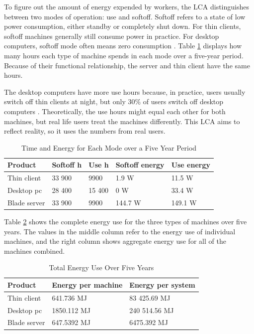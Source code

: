 \documentclass[final,journal,10pt,letterpaper,oneside,twocolumn,compsoc]%
{IEEEtran}
\begin{document}
To figure out the amount of energy expended by workers, the LCA distinguishes
between two modes of operation: use and softoff. Softoff refers to a state of
low power consumption, either standby or completely shut down. For thin clients,
softoff machines generally still consume power in practice. For desktop
computers, softoff mode often means zero consumption \cite{client}. Table
\ref{tab:6}
displays how many hours each type of machine spends in each mode over a
five-year period. Because of their functional relationship, the server and thin
client have the same hours.

The desktop computers have more use hours because, in practice, users usually
switch off thin clients at night, but only 30\% of users switch off desktop
computers \cite{client}. Theoretically, the use hours might equal each other for
both
machines, but real life users treat the machines differently. This LCA aims to
reflect reality, so it uses the numbers from real users.

\begin{table}[t!]
  \caption{Time and Energy for Each Mode over a Five Year Period}
  \label{tab:6}
  \centering
    \begin{tabular}{| l | l | l | l | l |}
      \hline
      Product & Softoff h & Use h & Softoff energy & Use energy \\
      \hline
      Thin client  & 33 900 & 9900  & 1.9 W   & 11.5 W \\
      Desktop pc   & 28 400 & 15 400 & 0 W     & 33.4 W \\
      Blade server & 33 900 & 9900  & 144.7 W & 149.1 W \\
      \hline
    \end{tabular}
\end{table}

Table \ref{tab:7} shows the complete energy use for the three types of machines
over five years. The values in the middle column refer to the energy use of
individual machines, and the right column shows aggregate energy use for all of
the machines combined.

\begin{table}[t!]
  \caption{Total Energy Use Over Five Years}
  \label{tab:7}
  \centering
    \begin{tabular}{|l|l|l|}
    \hline
    Product      & Energy per machine & Energy per system \\
    \hline
    Thin client  & 641.736 MJ         & 83 425.69 MJ \\
    Desktop pc   & 1850.112 MJ        & 240 514.56 MJ \\
    Blade server & 647.5392 MJ        & 6475.392 MJ \\
    \hline
    \end{tabular}
\end{table}
\end{document}
